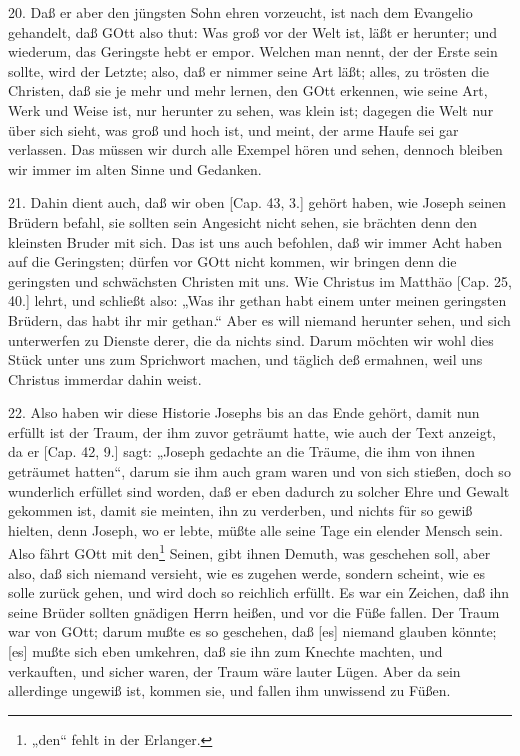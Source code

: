 20. Daß er aber den jüngsten Sohn ehren vorzeucht, ist nach dem Evangelio gehandelt, daß GOtt also thut: Was groß vor der Welt ist, läßt er herunter; und wiederum, das Geringste hebt er empor. Welchen man nennt, der der Erste sein sollte, wird der Letzte; also, daß er nimmer seine Art läßt; alles, zu trösten die Christen, daß sie je mehr und mehr lernen, den GOtt erkennen, wie seine Art, Werk und Weise ist, nur herunter zu sehen, was klein ist; dagegen die Welt nur über sich sieht, was groß und hoch ist, und meint, der arme Haufe sei gar verlassen. Das müssen wir durch alle Exempel hören und sehen, dennoch bleiben wir immer im alten Sinne und Gedanken.

21. Dahin dient auch, daß wir oben [Cap. 43, 3.] gehört haben, wie Joseph seinen Brüdern befahl, sie sollten sein Angesicht nicht sehen, sie brächten denn den kleinsten Bruder mit sich. Das ist uns auch befohlen, daß wir immer Acht haben auf die Geringsten; dürfen vor GOtt nicht kommen, wir bringen denn die geringsten und schwächsten Christen mit uns. Wie Christus im Matthäo [Cap. 25, 40.] lehrt, und schließt also: „Was ihr gethan habt einem unter meinen geringsten Brüdern, das habt ihr mir gethan.“ Aber es will niemand herunter sehen, und sich unterwerfen zu Dienste derer, die da nichts sind. Darum möchten wir wohl dies Stück unter uns zum Sprichwort machen, und täglich deß ermahnen, weil uns Christus immerdar dahin weist.

22. Also haben wir diese Historie Josephs bis an das Ende gehört, damit nun erfüllt ist der Traum, der ihm zuvor geträumt hatte, wie
auch der Text anzeigt, da er [Cap. 42, 9.] sagt: „Joseph gedachte an die Träume, die ihm von ihnen geträumet hatten“, darum sie ihm auch gram waren und von sich stießen, doch so wunderlich erfüllet sind worden, daß er eben dadurch zu solcher Ehre und Gewalt gekommen ist, damit sie meinten, ihn zu verderben, und nichts für so gewiß hielten, denn Joseph, wo er lebte, müßte alle seine Tage ein elender Mensch sein. Also fährt GOtt mit den\footnote{„den“ fehlt in der Erlanger.} Seinen, gibt ihnen Demuth, was geschehen soll, aber also, daß sich niemand versieht, wie es zugehen werde, sondern scheint, wie es solle zurück gehen, und wird doch so reichlich erfüllt. Es war ein Zeichen, daß ihn seine Brüder sollten gnädigen Herrn heißen, und vor die Füße fallen. Der Traum war von GOtt; darum mußte es so geschehen, daß [es] niemand glauben könnte; [es] mußte sich eben umkehren, daß sie ihn zum Knechte machten, und verkauften, und sicher waren, der Traum wäre lauter Lügen. Aber da sein allerdinge ungewiß ist, kommen sie, und fallen ihm unwissend zu Füßen.

